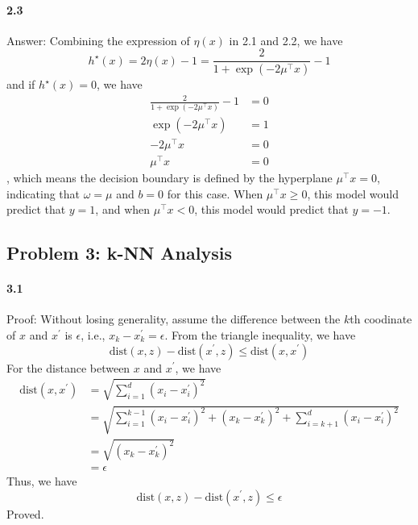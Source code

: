 \documentclass[11pt]{article}
\begin{document}
\paragraph{2.3}
Answer:
\newline
Combining the expression of $\eta(x)$ in 2.1 and 2.2, we have
\begin{equation}
 h^\star(x) = 2\eta(x) - 1 = \frac{2}{1 + \exp(-2\mu^\top x)} - 1
\end{equation}
and if $h^\star(x) = 0$, we have
\begin{equation}
  \begin{split}
    \frac{2}{1 + \exp(-2\mu^\top x)} - 1 &= 0 \\
    \exp(-2\mu^\top x) &= 1 \\
    -2\mu^\top x &= 0 \\
    \mu^\top x &= 0
  \end{split}
\end{equation}
, which means the decision boundary is defined by the hyperplane $\mu^\top x = 0$,
indicating that $\omega = \mu$ and $b = 0$ for this case.
When $\mu^\top x \geq 0$, this model would predict that $y = 1$, and when $\mu^\top x < 0$, this model would predict that $y = -1$.
\subsection*{\Large Problem 3: k-NN Analysis}

\paragraph{3.1}
Proof:
\newline
Without losing generality, assume the difference between the $k$th coodinate of $x$ and 
$x^\prime$ is $\epsilon$, i.e., $x_k - x_k^\prime =  \epsilon$.
From the triangle inequality, we have
\begin{equation}
  \text{dist}(x, z) - \text{dist}(x^\prime, z) \leq \text{dist}(x, x^\prime)
\end{equation}
For the distance between $x$ and $x^\prime$, we have
\begin{equation}
  \begin{split}
    \text{dist}(x, x^\prime) &= \sqrt{\sum_{i=1}^{d} (x_i - x_i^\prime)^2} \\
    &= \sqrt{\sum_{i=1}^{k-1} (x_i - x_i^\prime)^2 + (x_k - x_k^\prime)^2 + \sum_{i=k+1}^{d} (x_i - x_i^\prime)^2} \\
    &= \sqrt{(x_k - x_k^\prime)^2} \\
    &= \epsilon
  \end{split}
\end{equation}
Thus, we have
\begin{equation}
  \text{dist}(x, z) - \text{dist}(x^\prime, z) \leq \epsilon
\end{equation}
Proved.
\end{document}
